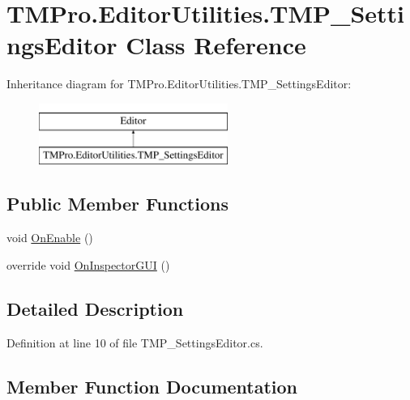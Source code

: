 \hypertarget{class_t_m_pro_1_1_editor_utilities_1_1_t_m_p___settings_editor}{}\section{T\+M\+Pro.\+Editor\+Utilities.\+T\+M\+P\+\_\+\+Settings\+Editor Class Reference}
\label{class_t_m_pro_1_1_editor_utilities_1_1_t_m_p___settings_editor}
Inheritance diagram for T\+M\+Pro.\+Editor\+Utilities.\+T\+M\+P\+\_\+\+Settings\+Editor\+:\begin{figure}[H]
\begin{center}
\leavevmode
\includegraphics[height=2.000000cm]{class_t_m_pro_1_1_editor_utilities_1_1_t_m_p___settings_editor}
\end{center}
\end{figure}
\subsection*{Public Member Functions}
\begin{DoxyCompactItemize}
\item 
void \mbox{\hyperlink{class_t_m_pro_1_1_editor_utilities_1_1_t_m_p___settings_editor_aa1e2d9326a325078d8bd7ad9cc186078}{On\+Enable}} ()
\item 
override void \mbox{\hyperlink{class_t_m_pro_1_1_editor_utilities_1_1_t_m_p___settings_editor_a11891e45e7299c16ee2cf20b420d09b1}{On\+Inspector\+G\+UI}} ()
\end{DoxyCompactItemize}


\subsection{Detailed Description}


Definition at line 10 of file T\+M\+P\+\_\+\+Settings\+Editor.\+cs.



\subsection{Member Function Documentation}
\mbox{\label{class_t_m_pro_1_1_editor_utilities_1_1_t_m_p___settings_editor_aa1e2d9326a325078d8bd7ad9cc186078}} 
